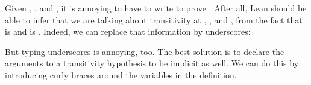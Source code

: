 \documentclass[letterpaper,10pt,english]{sphinxmanual}
\begin{document}
\sphinxAtStartPar
Given , , and ,
it is annoying to have to write  to prove .
After all,
Lean should be able to infer that we are talking about transitivity at
, , and ,
from the fact that  is  and  is .
Indeed, we can replace that information by underscores:

\begin{sphinxVerbatim}[commandchars=\\\{\}]
       

              
         
     
     
\end{sphinxVerbatim}

\sphinxAtStartPar
But typing underscores is annoying, too.
The best solution is to declare the arguments 
to a transitivity hypothesis to be implicit as well.
We can do this by introducing curly braces around the
variables in the definition.
\end{document}
